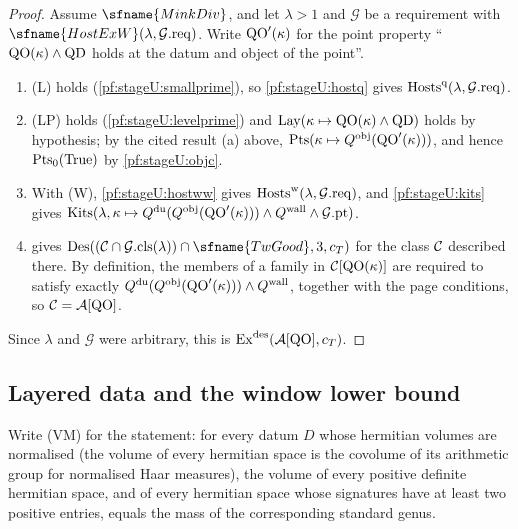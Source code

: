 \begin{proof}
Assume $\sfname{MinkDiv}$, and let $\lambda>1$ and $\mathcal G$ be a requirement with $\sfname{HostExW}(\lambda,\mathcal G.\mathrm{req})$.
Write $\mathrm{QO}'(\kappa)$ for the point property ``$\mathrm{QO}(\kappa)\wedge\mathrm{QD}$ holds at the datum and object of the
point''.
\begin{enumerate}[label=\arabic*.]
\item (L) holds (\cref{pf:stageU:smallprime}), so \cref{pf:stageU:hostq} gives
$\mathrm{Hosts}^{\mathrm q}(\lambda,\mathcal G.\mathrm{req})$.
\item (LP) holds (\cref{pf:stageU:levelprime}) and $\mathrm{Lay}(\kappa\mapsto\mathrm{QO}(\kappa)\wedge\mathrm{QD})$ holds by
hypothesis; by the cited result (a) above, $\mathrm{Pts}(\kappa\mapsto Q^{\mathrm{obj}}(\mathrm{QO}'(\kappa)))$, and hence
$\mathrm{Pts}_0(\mathrm{True})$ by \cref{pf:stageU:objc}.
\item With (W), \cref{pf:stageU:hostww} gives $\mathrm{Hosts}^{\mathrm w}(\lambda,\mathcal G.\mathrm{req})$, and
\cref{pf:stageU:kits} gives
$\mathrm{Kits}(\lambda,\kappa\mapsto Q^{\mathrm{du}}(Q^{\mathrm{obj}}(\mathrm{QO}'(\kappa)))\wedge Q^{\mathrm{wall}}\wedge\mathcal G.\mathrm{pt})$.
\item {} gives $\stageUDes((\stageUC\cap\mathcal G.\mathrm{cls}(\lambda))\cap\sfname{TwGood},3,c_T)$ for the class
$\mathcal{C}$ described there. By definition, the members of a family in $\mathcal{C}[\mathrm{QO}(\kappa)]$ are required to satisfy
exactly $Q^{\mathrm{du}}(Q^{\mathrm{obj}}(\mathrm{QO}'(\kappa)))\wedge Q^{\mathrm{wall}}$, together with the page conditions, so
$\mathcal{C}=\mathcal{A}[\mathrm{QO}]$.
\end{enumerate}
Since $\lambda$ and $\mathcal G$ were arbitrary, this is $\mathrm{Ex}^{\mathrm{des}}(\mathcal{A}[\mathrm{QO}],c_T)$.
\end{proof}

\subsection{Layered data and the window lower bound}\label{sec:pf:stageU:layers}

Write (VM) for the statement: for every datum $D$ whose hermitian volumes are normalised (the volume of every
hermitian space is the covolume of its arithmetic group for normalised Haar measures), the volume of every positive
definite hermitian space, and of every hermitian space whose signatures have at least two positive entries, equals the
mass of the corresponding standard genus.

